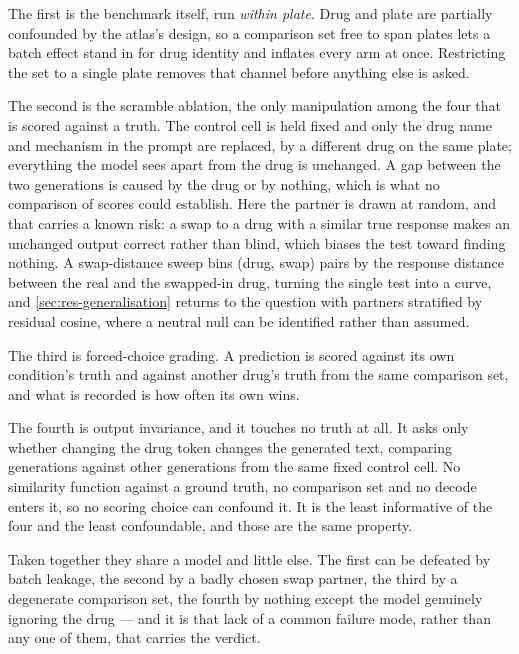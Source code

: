 The first is the benchmark itself, run \emph{within plate}. Drug and plate are
partially confounded by the atlas's design, so a comparison set free to span
plates lets a batch effect stand in for drug identity and inflates every arm at
once. Restricting the set to a single plate removes that channel before anything
else is asked.

The second is the scramble ablation, the only manipulation among the four that is scored against a truth. The control cell is held fixed and only the drug name and mechanism in the
prompt are replaced, by a different drug on the same plate; everything the model
sees apart from the drug is unchanged. A gap between the two generations is
caused by the drug or by nothing, which is what no comparison of scores could
establish. Here the partner is drawn at random, and that carries a known risk: a
swap to a drug with a similar true response makes an unchanged output correct
rather than blind, which biases the test toward finding nothing. A swap-distance
sweep bins (drug, swap) pairs by the response distance between the real and the
swapped-in drug, turning the single test into a curve, and
\cref{sec:res-generalisation} returns to the question with partners stratified by
residual cosine, where a neutral null can be identified rather than assumed.

The third is forced-choice grading. A prediction is scored against its own
condition's truth and against another drug's truth from the same comparison set,
and what is recorded is how often its own wins. 

The fourth is output invariance, and it touches no truth at all. It asks only
whether changing the drug token changes the generated text, comparing generations
against other generations from the same fixed control cell. No similarity
function against a ground truth, no comparison set and no decode enters it, so no
scoring choice can confound it. It is the least informative of the four and the
least confoundable, and those are the same property.

Taken together they share a model and little else. The first can be defeated by
batch leakage, the second by a badly chosen swap partner, the third by a
degenerate comparison set, the fourth by nothing except the model genuinely
ignoring the drug --- and it is that lack of a common failure mode, rather than
any one of them, that carries the verdict.

